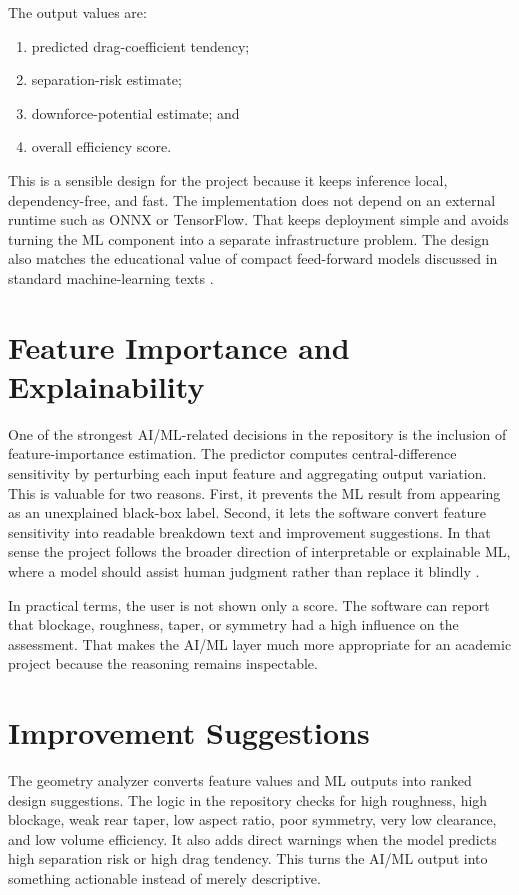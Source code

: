 \documentclass[12pt,a4paper,titlepage]{report}
\begin{document}
The output values are:
\begin{enumerate}
\item predicted drag-coefficient tendency;
\item separation-risk estimate;
\item downforce-potential estimate; and
\item overall efficiency score.
\end{enumerate}

This is a sensible design for the project because it keeps inference local, dependency-free, and fast. The implementation does not depend on an external runtime such as ONNX or TensorFlow. That keeps deployment simple and avoids turning the ML component into a separate infrastructure problem. The design also matches the educational value of compact feed-forward models discussed in standard machine-learning texts \cite{bishop,goodfellow}.

\section{Feature Importance and Explainability}
One of the strongest AI/ML-related decisions in the repository is the inclusion of feature-importance estimation. The predictor computes central-difference sensitivity by perturbing each input feature and aggregating output variation. This is valuable for two reasons. First, it prevents the ML result from appearing as an unexplained black-box label. Second, it lets the software convert feature sensitivity into readable breakdown text and improvement suggestions. In that sense the project follows the broader direction of interpretable or explainable ML, where a model should assist human judgment rather than replace it blindly \cite{molnar,ribeiro}.

In practical terms, the user is not shown only a score. The software can report that blockage, roughness, taper, or symmetry had a high influence on the assessment. That makes the AI/ML layer much more appropriate for an academic project because the reasoning remains inspectable.

\section{Improvement Suggestions}
The geometry analyzer converts feature values and ML outputs into ranked design suggestions. The logic in the repository checks for high roughness, high blockage, weak rear taper, low aspect ratio, poor symmetry, very low clearance, and low volume efficiency. It also adds direct warnings when the model predicts high separation risk or high drag tendency. This turns the AI/ML output into something actionable instead of merely descriptive.
\end{document}
